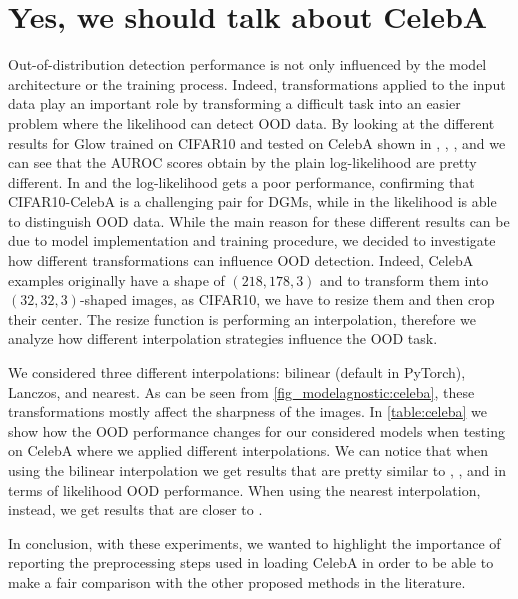 {\section{Yes, we should talk about CelebA}
\label{appendix_modelagnostic:celeba}
Out-of-distribution detection performance is not only influenced by the model architecture or the training process. Indeed, transformations applied to the input data play an important role by transforming a difficult task into an easier problem where the likelihood can detect OOD data. By looking at the different results for Glow trained on CIFAR10 and tested on CelebA shown in \cite{hendrycks_deep_2019}, \cite{kirichenko_why_2020}, \cite{morningstar_density_2021}, and \cite{ahmadian_likelihoodfree_2021} we can see that the AUROC scores obtain by the plain log-likelihood are pretty different. In \cite{hendrycks_deep_2019} and  \cite{kirichenko_why_2020} the log-likelihood gets a poor performance, confirming that CIFAR10-CelebA is a challenging pair for DGMs, while in \cite{morningstar_density_2021} the likelihood is able to distinguish OOD data. While the main reason for these different results can be due to model implementation and training procedure, we decided to investigate how different transformations can influence OOD detection. Indeed, CelebA examples originally have a shape of $(218, 178, 3)$ and to transform them into $(32, 32, 3)$-shaped images, as CIFAR10, we have to resize them and then crop their center. The resize function is performing an interpolation, therefore we analyze how different interpolation strategies influence the OOD task. 

We considered three different interpolations: bilinear (default in PyTorch), Lanczos, and nearest. As can be seen from \cref{fig_modelagnostic:celeba}, these transformations mostly affect the sharpness of the images. In \cref{table:celeba} we show how the OOD performance changes for our considered models when testing on CelebA where we applied different interpolations. We can notice that when using the bilinear interpolation we get results that are pretty similar to \cite{hendrycks_deep_2019}, \cite{kirichenko_why_2020}, and \cite{ahmadian_likelihoodfree_2021} in terms of likelihood OOD performance. When using the nearest interpolation, instead, we get results that are closer to \cite{morningstar_density_2021}. 

In conclusion, with these experiments, we wanted to highlight the importance of reporting the preprocessing steps used in loading CelebA in order to be able to make a fair comparison with the other proposed methods in the literature.


}
